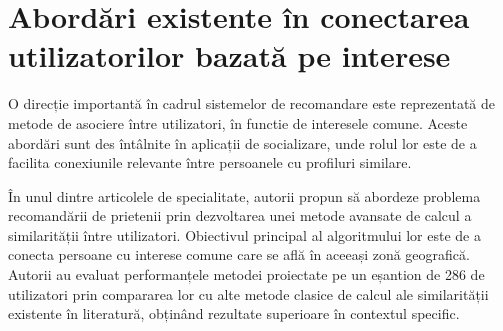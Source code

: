 \section{Abordări existente în conectarea utilizatorilor bazată pe interese}
\label{sec:ch2sec3}
O direcție importantă în cadrul sistemelor de recomandare este reprezentată de metode de asociere între utilizatori, în functie de interesele comune.
Aceste abordări sunt des întâlnite în aplicații de socializare, unde rolul lor este de a facilita conexiunile relevante între persoanele cu profiluri similare.
\par
În unul dintre articolele de specialitate\cite{tsakalakis2018improved}, autorii propun să abordeze problema recomandării de prietenii prin dezvoltarea unei metode avansate de calcul a similarității între utilizatori.
Obiectivul principal al algoritmului lor este de a conecta persoane cu interese comune care se află în aceeași zonă geografică.
Autorii au evaluat performanțele metodei proiectate pe un eșantion de 286 de utilizatori prin compararea lor cu alte metode clasice de calcul ale similarității existente în literatură, obținând rezultate superioare în contextul specific.